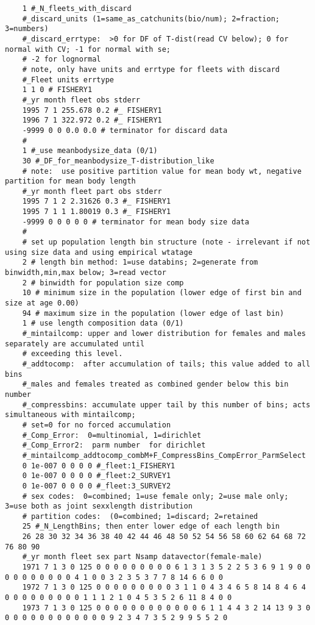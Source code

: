 \begin{landscape}
{\begin{verbatim}
	1 #_N_fleets_with_discard
	#_discard_units (1=same_as_catchunits(bio/num); 2=fraction; 3=numbers)
	#_discard_errtype:  >0 for DF of T-dist(read CV below); 0 for normal with CV; -1 for normal with se; 
	# -2 for lognormal
	# note, only have units and errtype for fleets with discard 
	#_Fleet units errtype
	1 1 0 # FISHERY1
	#_yr month fleet obs stderr
	1995 7 1 255.678 0.2 #_ FISHERY1
	1996 7 1 322.972 0.2 #_ FISHERY1
	-9999 0 0 0.0 0.0 # terminator for discard data 
	#
	1 #_use meanbodysize_data (0/1)
	30 #_DF_for_meanbodysize_T-distribution_like
	# note:  use positive partition value for mean body wt, negative partition for mean body length 
	#_yr month fleet part obs stderr
	1995 7 1 2 2.31626 0.3 #_ FISHERY1
	1995 7 1 1 1.80019 0.3 #_ FISHERY1
	-9999 0 0 0 0 0 # terminator for mean body size data 
	#
	# set up population length bin structure (note - irrelevant if not using size data and using empirical wtatage
	2 # length bin method: 1=use databins; 2=generate from binwidth,min,max below; 3=read vector
	2 # binwidth for population size comp 
	10 # minimum size in the population (lower edge of first bin and size at age 0.00) 
	94 # maximum size in the population (lower edge of last bin) 
	1 # use length composition data (0/1)
	#_mintailcomp: upper and lower distribution for females and males separately are accumulated until 
	# exceeding this level.
	#_addtocomp:  after accumulation of tails; this value added to all bins
	#_males and females treated as combined gender below this bin number 
	#_compressbins: accumulate upper tail by this number of bins; acts simultaneous with mintailcomp; 
	# set=0 for no forced accumulation
	#_Comp_Error:  0=multinomial, 1=dirichlet
	#_Comp_Error2:  parm number  for dirichlet
	#_mintailcomp_addtocomp_combM+F_CompressBins_CompError_ParmSelect
	0 1e-007 0 0 0 0 #_fleet:1_FISHERY1
	0 1e-007 0 0 0 0 #_fleet:2_SURVEY1
	0 1e-007 0 0 0 0 #_fleet:3_SURVEY2
	# sex codes:  0=combined; 1=use female only; 2=use male only; 3=use both as joint sexxlength distribution
	# partition codes:  (0=combined; 1=discard; 2=retained
	25 #_N_LengthBins; then enter lower edge of each length bin
	26 28 30 32 34 36 38 40 42 44 46 48 50 52 54 56 58 60 62 64 68 72 76 80 90
	#_yr month fleet sex part Nsamp datavector(female-male)
	1971 7 1 3 0 125 0 0 0 0 0 0 0 0 0 6 1 3 1 3 5 2 2 5 3 6 9 1 9 0 0 0 0 0 0 0 0 0 0 4 1 0 0 3 2 3 5 3 7 7 8 14 6 6 0 0
	1972 7 1 3 0 125 0 0 0 0 0 0 0 0 0 3 1 1 0 4 3 4 6 5 8 14 8 4 6 4 0 0 0 0 0 0 0 0 0 1 1 1 2 1 0 4 5 3 5 2 6 11 8 4 0 0
	1973 7 1 3 0 125 0 0 0 0 0 0 0 0 0 0 0 0 6 1 1 4 4 3 2 14 13 9 3 0 0 0 0 0 0 0 0 0 0 0 0 0 9 2 3 4 7 3 5 2 9 9 5 5 2 0

\end{verbatim}}
\end{landscape}
